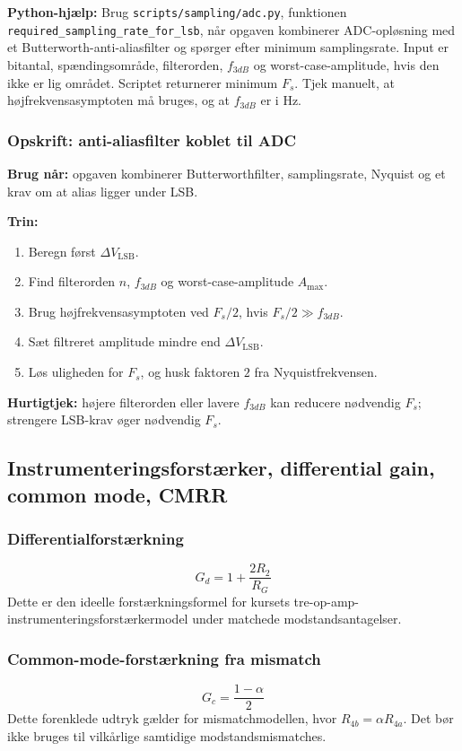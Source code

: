 \textbf{Python-hjælp:} Brug \texttt{scripts/sampling/adc.py}, funktionen \texttt{required\_sampling\_rate\_for\_lsb}, når opgaven kombinerer ADC-opløsning med et Butterworth-anti-aliasfilter og spørger efter minimum samplingsrate. Input er bitantal, spændingsområde, filterorden, \(f_{3dB}\) og worst-case-amplitude, hvis den ikke er lig området. Scriptet returnerer minimum \(F_s\). Tjek manuelt, at højfrekvensasymptoten må bruges, og at \(f_{3dB}\) er i Hz.

\subsubsection{Opskrift: anti-aliasfilter koblet til ADC}
\textbf{Brug når:} opgaven kombinerer Butterworthfilter, samplingsrate, Nyquist og et krav om at alias ligger under LSB.

\textbf{Trin:}
\begin{enumerate}
    \item Beregn først \(\Delta V_{\mathrm{LSB}}\).
    \item Find filterorden \(n\), \(f_{3dB}\) og worst-case-amplitude \(A_{\max}\).
    \item Brug højfrekvensasymptoten ved \(F_s/2\), hvis \(F_s/2\gg f_{3dB}\).
    \item Sæt filtreret amplitude mindre end \(\Delta V_{\mathrm{LSB}}\).
    \item Løs uligheden for \(F_s\), og husk faktoren \(2\) fra Nyquistfrekvensen.
\end{enumerate}

\textbf{Hurtigtjek:} højere filterorden eller lavere \(f_{3dB}\) kan reducere nødvendig \(F_s\); strengere LSB-krav øger nødvendig \(F_s\).

\subsection{Instrumenteringsforstærker, differential gain, common mode, CMRR}

\subsubsection{Differentialforstærkning}
\[
G_d=1+\frac{2R_2}{R_G}
\]
Dette er den ideelle forstærkningsformel for kursets tre-op-amp-instrumenteringsforstærkermodel under matchede modstandsantagelser.

\subsubsection{Common-mode-forstærkning fra mismatch}
\[
G_c=\frac{1-\alpha}{2}
\]
Dette forenklede udtryk gælder for mismatchmodellen, hvor \(R_{4b}=\alpha R_{4a}\). Det bør ikke bruges til vilkårlige samtidige modstandsmismatches.

